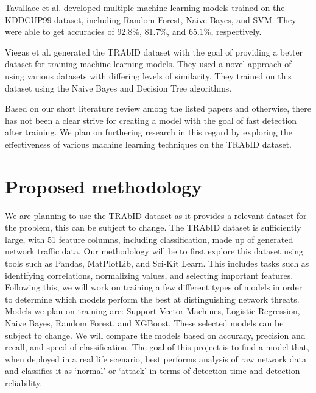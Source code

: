 Tavallaee et al. developed multiple machine learning models trained on the KDDCUP99 dataset, including Random Forest, Naive Bayes, and SVM. They were able to get accuracies of 92.8\%, 81.7\%, and 65.1\%, respectively. \cite{tavallaee2009detailed}

Viegas et al. generated the TRAbID dataset with the goal of providing a better dataset for training machine learning models. They used a novel approach of using various datasets with differing levels of similarity. They trained on this dataset using the Naive Bayes and Decision Tree algorithms. \cite{viegas2017toward}

Based on our short literature review among the listed papers and otherwise, there has not been a clear strive for creating a model with the goal of fast detection after training. We plan on furthering research in this regard by exploring the effectiveness of various machine learning techniques on the TRAbID dataset.

\section{Proposed methodology}
We are planning to use the TRAbID dataset \cite{viegas2017toward} as it provides a relevant dataset for the problem, this can be subject to change. The TRAbID dataset is sufficiently large, with 51 feature columns, including classification, made up of generated network traffic data. Our methodology will be to first explore this dataset using tools such as Pandas, MatPlotLib, and Sci-Kit Learn. This includes tasks such as identifying correlations, normalizing values, and selecting important features. Following this, we will work on training a few different types of models in order to determine which models perform the best at distinguishing network threats. Models we plan on training are: Support Vector Machines, Logistic Regression, Naive Bayes, Random Forest, and XGBoost. These selected models can be subject to change. We will compare the models based on accuracy, precision and recall, and speed of classification. The goal of this project is to find a model that, when deployed in a real life scenario, best performs analysis of raw network data and classifies it as `normal' or `attack' in terms of detection time and detection reliability.


